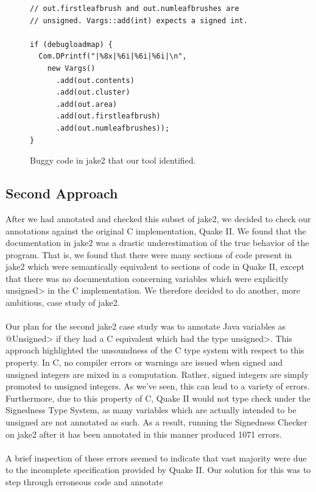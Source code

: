 \begin{figure}
\begin{lstlisting}
// out.firstleafbrush and out.numleafbrushes are
// unsigned. Vargs::add(int) expects a signed int.

if (debugloadmap) {
  Com.DPrintf("|%8x|%6i|%6i|%6i|\n",
    new Vargs()
      .add(out.contents)
      .add(out.cluster)
      .add(out.area)
      .add(out.firstleafbrush)
      .add(out.numleafbrushes));
}

\end{lstlisting}
\caption{Buggy code in jake2 that our tool identified.}
\label{fig:bug}
\end{figure}

\subsection{Second Approach} \label{full}
After we had annotated and checked this subset of jake2, we decided to check
our annotations against the original C implementation, Quake II. We found that
the documentation in jake2 was a drastic underestimation of the true behavior
of the program. That is, we found that there were many sections of code present
in jake2 which were semantically equivalent to sections of code in Quake II,
except that there was no documentation concerning variables which were
explicitly \<unsigned> in the C implementation. We therefore decided to do
another, more ambitious, case study of jake2.\\
\\
Our plan for the second jake2 case study was to annotate Java variables as
\<@Unsigned> if they had a C equivalent which had the type \<unsigned>. This
approach highlighted the unsoundness of the C type system with respect to this
property. In C, no compiler errors or warnings are issued when signed and
unsigned integers are mixed in a computation. Rather, signed integers are
simply promoted to unsigned integers. As we've seen, this can lead to a variety
of errors. Furthermore, due to this property of C, Quake II would not type
check under the Signedness Type System, as many variables which are actually
intended to be unsigned are not annotated as such. As a result, running the
Signedness Checker on jake2 after it has been annotated in this manner
produced 1071 errors.\\
\\
A brief inspection of these errors seemed to indicate
that vast majority were due to the incomplete specification provided by
Quake II. Our solution for this was to step through erroneous code and annotate

